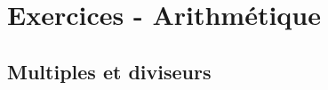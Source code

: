 \bigskip

\newpage

\section*{Exercices - Arithmétique}
{\setlength{\columnseprule}{0pt}
\setcounter{NumEx}{1}


\renewcommand{\arraystretch}{1.3}  %

\subsection*{Multiples et diviseurs}

\begin{Exercice}
\leavevmode\vspace{-\baselineskip}


\end{Exercice}}
